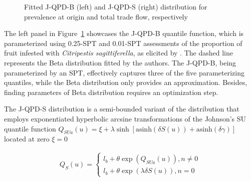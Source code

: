 \documentclass[
  fleqn,
  deca,
  blindrev
]{informs4}
\begin{document}
\begin{figure}


\caption{\label{fig-jqpd1}Fitted J-QPD-B (left) and J-QPD-S (right)
distribution for prevalence at origin and total trade flow,
respectively}

\end{figure}%

The left panel in Figure~\ref{fig-jqpd1} showcases the J-QPD-B quantile
function, which is parameterized using 0.25-SPT and 0.01-SPT assessments
of the proportion of fruit infested with \emph{Citripestis
sagittiferella}, as elicited by
\citet{efsa2023RiskAssessmentCitripestis}. The dashed line represents
the Beta distribution fitted by the authors. The J-QPD-B, being
parameterized by an SPT, effectively captures three of the five
parameterizing quantiles, while the Beta distribution only provides an
approximation. Besides, finding parameters of Beta distribution requires
an optimization step.

The J-QPD-S distribution is a semi-bounded variant of the distribution
that employs exponentiated hyperbolic arcsine transformations of the
Johnson's SU quantile function
\(Q_{SUa}(u) = \xi + \lambda\sinh\left[\text{asinh}(\delta S(u)) + \text{asinh}(\delta\gamma)\right]\)
located at zero \(\xi=0\)
\citep{hadlock2017JohnsonQuantileParameterizedDistributions}

\[
\begin{gathered}
Q_S(u)=\begin{cases}
l_b+\theta\exp\left(Q_{SUa}(u)\right),n \neq 0\\
l_b+\theta\exp\left(\lambda\delta S(u)\right),n=0
\end{cases}
\end{gathered}
\]
\end{document}
